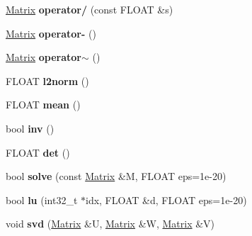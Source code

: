 \begin{DoxyCompactItemize}
\item 
\hypertarget{class_matrix_a87c44194ef5ef90cade473cb15b2bdbd}{\hyperlink{class_matrix}{Matrix} {\bfseries operator/} (const F\+L\+O\+A\+T \&s)}\label{class_matrix_a87c44194ef5ef90cade473cb15b2bdbd}

\item 
\hypertarget{class_matrix_aeeb01663c821db08857fc7ae58a67511}{\hyperlink{class_matrix}{Matrix} {\bfseries operator-\/} ()}\label{class_matrix_aeeb01663c821db08857fc7ae58a67511}

\item 
\hypertarget{class_matrix_aff3fd507bacd00a00d0afa93d134bcd8}{\hyperlink{class_matrix}{Matrix} {\bfseries operator$\sim$} ()}\label{class_matrix_aff3fd507bacd00a00d0afa93d134bcd8}

\item 
\hypertarget{class_matrix_a66d51f02cbdbe51e0b17f941d394074b}{F\+L\+O\+A\+T {\bfseries l2norm} ()}\label{class_matrix_a66d51f02cbdbe51e0b17f941d394074b}

\item 
\hypertarget{class_matrix_a33cc9e715f712c871098c6da9557c151}{F\+L\+O\+A\+T {\bfseries mean} ()}\label{class_matrix_a33cc9e715f712c871098c6da9557c151}

\item 
\hypertarget{class_matrix_a628bc67cde7662679fcd32da06010839}{bool {\bfseries inv} ()}\label{class_matrix_a628bc67cde7662679fcd32da06010839}

\item 
\hypertarget{class_matrix_a231fbfc477203e52b8fd6654052a3ee6}{F\+L\+O\+A\+T {\bfseries det} ()}\label{class_matrix_a231fbfc477203e52b8fd6654052a3ee6}

\item 
\hypertarget{class_matrix_a97d9586c66ba66764ae69ca5e7967f78}{bool {\bfseries solve} (const \hyperlink{class_matrix}{Matrix} \&M, F\+L\+O\+A\+T eps=1e-\/20)}\label{class_matrix_a97d9586c66ba66764ae69ca5e7967f78}

\item 
\hypertarget{class_matrix_a16885d0fe614848a107e1346f6a9dd51}{bool {\bfseries lu} (int32\+\_\+t $\ast$idx, F\+L\+O\+A\+T \&d, F\+L\+O\+A\+T eps=1e-\/20)}\label{class_matrix_a16885d0fe614848a107e1346f6a9dd51}

\item 
\hypertarget{class_matrix_a756a66e73270a5c46d53a55c1e10bd24}{void {\bfseries svd} (\hyperlink{class_matrix}{Matrix} \&U, \hyperlink{class_matrix}{Matrix} \&W, \hyperlink{class_matrix}{Matrix} \&V)}\label{class_matrix_a756a66e73270a5c46d53a55c1e10bd24}

\end{DoxyCompactItemize}
